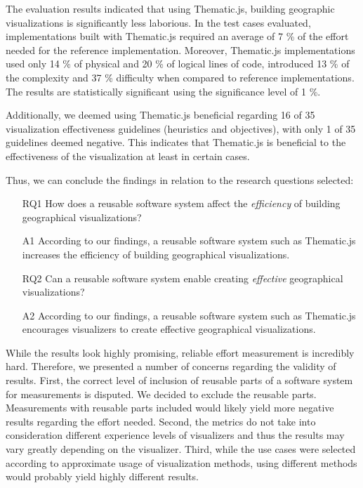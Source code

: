 The evaluation results indicated that using Thematic.js, building geographic visualizations is significantly less laborious. In the test cases evaluated, implementations built with Thematic.js required an average of 7 \% of the effort needed for the reference implementation. Moreover, Thematic.js implementations used only 14 \% of physical and 20 \% of logical lines of code, introduced 13 \% of the complexity and 37 \% difficulty when compared to reference implementations. The results are statistically significant using the significance level of 1 \%.

Additionally, we deemed using Thematic.js beneficial regarding 16 of 35 visualization effectiveness guidelines (heuristics and objectives), with only 1 of 35 guidelines deemed negative. This indicates that Thematic.js is beneficial to the effectiveness of the visualization at least in certain cases.

Thus, we can conclude the findings in relation to the research questions selected:

\begin{enumerate}
	\item[RQ1] How does a reusable software system affect the \emph{efficiency} of building geographical visualizations?
	\item[A1] According to our findings, a reusable software system such as Thematic.js increases the efficiency of building geographical visualizations.
	\item[RQ2] Can a reusable software system enable creating \emph{effective} geographical visualizations?
	\item[A2] According to our findings, a reusable software system such as Thematic.js encourages visualizers to create effective geographical visualizations.
\end{enumerate}

While the results look highly promising, reliable effort measurement is incredibly hard. Therefore, we presented a number of concerns regarding the validity of results. First, the correct level of inclusion of reusable parts of a software system for measurements is disputed. We decided to exclude the reusable parts. Measurements with reusable parts included would likely yield more negative results regarding the effort needed. Second, the metrics do not take into consideration different experience levels of visualizers and thus the results may vary greatly depending on the visualizer. Third, while the use cases were selected according to approximate usage of visualization methods, using different methods would probably yield highly different results.

